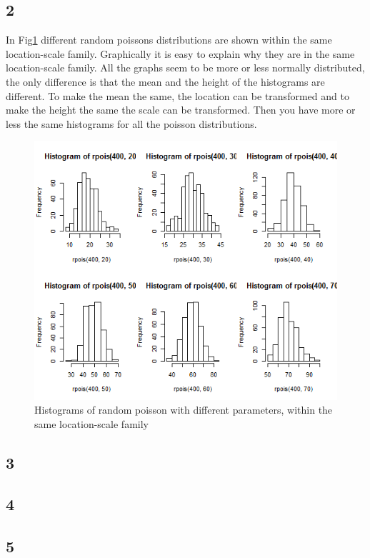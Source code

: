 \documentclass{article}
\begin{document}
    \subsection*{2}
      In Fig\ref{fig:Hist3_2} different random poissons distributions are shown within the same location-scale family.
      Graphically it is easy to explain why they are in the same location-scale family.
      All the graphs seem to be more or less normally distributed,
      the only difference is that the mean and the height of the histograms are different.
      To make the mean the same, the location can be transformed and to make the height the same the scale can be transformed.
      Then you have more or less the same histograms for all the poisson distributions.
      \begin{figure}[H]
          \centering
          \includegraphics[scale=0.3]{../results/3_2.png}
          \caption{Histograms of random poisson with different parameters, within the same location-scale family}
          \label{fig:Hist3_2}
      \end{figure}

    \subsection*{3}
    \subsection*{4}
    \subsection*{5}
    
\end{document}
